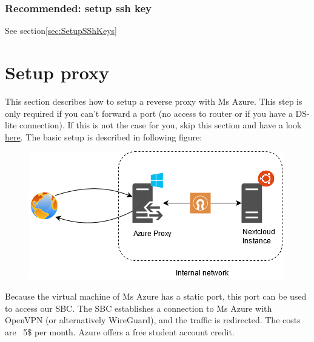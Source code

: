\documentclass[a4paper,12pt]{article}
\begin{document}
	\subsubsection{Recommended: setup ssh key}
	See section\ref{sec:SetupSShKeys}
	\section{Setup proxy}
	This section describes how to setup a reverse proxy with Ms Azure. This step is only required if you can't forward a port (no access to router or if you have a DS-lite connection). If this is not the case for you, skip this section and have a look \href{https://help.dyn.com/remote-access/getting-started-with-remote-access/}{here}.\newline
	 The basic setup is described in following figure:
	\begin{figure}[H]
		\centering
		\includegraphics{images/ProjectOverviewOvpn.png}
	\end{figure}
	Because the virtual machine of Ms Azure has a static port, this port can be used to access our SBC. The SBC establishes a connection to Ms Azure with OpenVPN (or alternatively WireGuard), and the traffic is redirected.
	The costs are ~5\$ per month. Azure offers a free student account credit.
\end{document}
